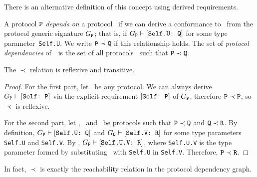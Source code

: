 \documentclass[../generics]{subfiles}
\begin{document}
There is an alternative definition of this concept using derived requirements.
\begin{definition}
A protocol $\texttt{P}$ \emph{depends on} a protocol \tQ\ if we can derive a conformance to \tQ\ from the protocol generic signature $G_{\texttt{P}}$; that is, if $G_{\texttt{P}}\vdash[\texttt{Self.U:~Q}]$ for some type parameter~\texttt{Self.U}. We write $\texttt{P}\prec\texttt{Q}$ if this relationship holds. The set of \emph{protocol dependencies} of~\tP\ is the set of all protocols \tQ\ such that $\texttt{P}\prec\texttt{Q}$.
\end{definition}

\begin{proposition}
The $\prec$ relation is reflexive and transitive.
\end{proposition}
\begin{proof}
For the first part, let \tP\ be any protocol. We can always derive $G_{\texttt{P}}\vdash[\texttt{Self:~P}]$ via the explicit requirement $[\texttt{Self:~P}]$ of $G_{\texttt{P}}$, therefore $\texttt{P}\prec\texttt{P}$, so $\prec$ is reflexive.

For the second part, let \tP, \tQ\ and \tR\ be protocols such that $\texttt{P}\prec\texttt{Q}$ and $\texttt{Q}\prec\texttt{R}$.  By definition, $G_{\texttt{P}}\vdash[\texttt{Self.U:~Q}]$ and $G_{\texttt{Q}}\vdash[\texttt{Self.V:~R}]$ for some type parameters \texttt{Self.U} and \texttt{Self.V}. By , $G_{\texttt{P}}\vdash[\texttt{Self.U.V:~R}]$, where \texttt{Self.U.V} is the type parameter formed by substituting \tSelf\ with \texttt{Self.U} in \texttt{Self.V}. Therefore, $\texttt{P}\prec\texttt{R}$.
\end{proof}

In fact, $\prec$ is exactly the reachability relation in the protocol dependency graph.
\end{document}
